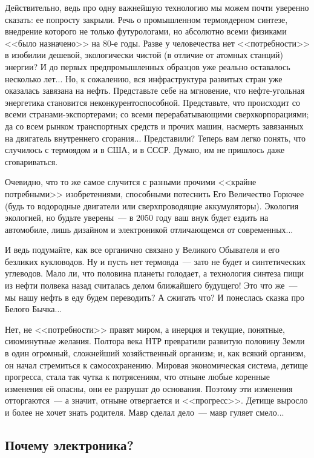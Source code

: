 \documentclass{scrbook}
\newcommand{\flqq}{<<}
\newcommand{\frqq}{>>}
\newcommand{\mdash}{~--- }
\newcommand{\essaysection}[1]{\subsection*{#1}\nopagebreak}
\begin{document}
Действительно, ведь про одну важнейшую технологию мы можем почти уверенно сказать: ее попросту закрыли. Речь о промышленном термоядерном синтезе, внедрение которого не только футурологами, но абсолютно всеми физиками {\flqq}было назначено{\frqq} на 80-е годы. Разве у человечества нет {\flqq}потребности{\frqq} в изобилии дешевой, экологически чистой (в отличие от атомных станций) энергии? И до первых предпромышленных образцов уже реально оставалось несколько лет... Но, к сожалению, вся инфраструктура развитых стран уже оказалась завязана на нефть. Представьте себе на мгновение, что нефте-угольная энергетика становится неконкурентоспособной. Представьте, что происходит со всеми странами-экспортерами; со всеми перерабатывающими сверхкорпорациями; да со всем рынком транспортных средств и прочих машин, насмерть завязанных на двигатель внутреннего сгорания... Представили? Теперь вам легко понять, что случилось с термоядом и в США, и в СССР. Думаю, им не пришлось даже сговариваться.

Очевидно, что то же самое случится с разными прочими {\flqq}крайне потребными{\frqq} изобретениями, способными потеснить Его Величество Горючее (будь то водородные двигатели или сверхпроводящие аккумуляторы). Экология экологией, но будьте уверены{\mdash}в 2050 году ваш внук будет ездить на автомобиле, лишь дизайном и электроникой отличающемся от современных...

И ведь подумайте, как все органично связано у Великого Обывателя и его безликих кукловодов. Ну и пусть нет термояда{\mdash}зато не будет и синтетических углеводов. Мало ли, что половина планеты голодает, а технология синтеза пищи из нефти полвека назад считалась делом ближайшего будущего! Это что же{\mdash}мы нашу нефть в еду будем переводить? А сжигать что? И понеслась сказка про Белого Бычка...

Нет, не {\flqq}потребности{\frqq} правят миром, а инерция и текущие, понятные, сиюминутные желания. Полтора века НТР превратили развитую половину Земли в один огромный, сложнейший хозяйственный организм; и, как всякий организм, он начал стремиться к самосохранению. Мировая экономическая система, детище прогресса, стала так чутка к потрясениям, что отныне любые коренные изменения ей опасны, они ее разрушат до основания. Поэтому эти изменения отторгаются{\mdash}а значит, отныне отвергается и {\flqq}прогресс{\frqq}. Детище выросло и более не хочет знать родителя. Мавр сделал дело{\mdash}мавр гуляет смело...

\essaysection{Почему электроника?}
\end{document}
